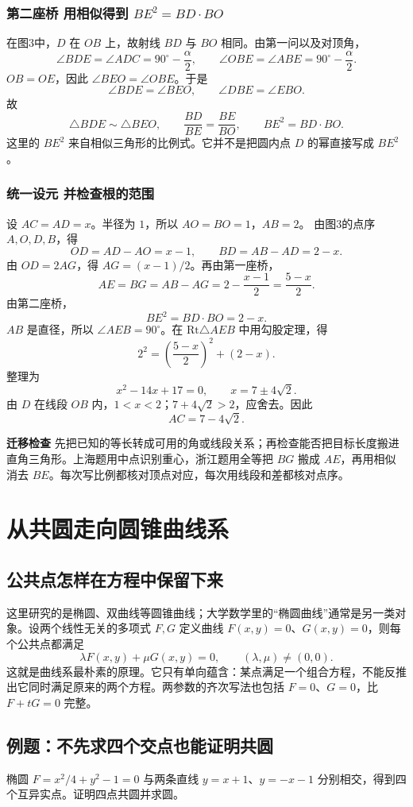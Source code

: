 \documentclass[lang=cn,12pt,fontset=none,a4paper,openany]{beautybook}
\newcommand{\level}[1]{\par\smallskip\noindent\textcolor{coverfgcolor}{\textbf{#1}}\quad}
\begin{document}
\subsection{第二座桥 用相似得到 $BE^2=BD\cdot BO$}
在图3中，$D$ 在 $OB$ 上，故射线 $BD$ 与 $BO$ 相同。由第一问以及对顶角，
\[
 \angle BDE=\angle ADC=90^\circ-\frac\alpha2,
 \qquad
 \angle OBE=\angle ABE=90^\circ-\frac\alpha2.
\]
$OB=OE$，因此 $\angle BEO=\angle OBE$。于是
\[
 \angle BDE=\angle BEO,
 \qquad \angle DBE=\angle EBO.
\]
故
\[
 \triangle BDE\sim\triangle BEO,
 \qquad \frac{BD}{BE}=\frac{BE}{BO},
 \qquad \boxed{BE^2=BD\cdot BO}.
\]
这里的 $BE^2$ 来自相似三角形的比例式。它并不是把圆内点 $D$ 的幂直接写成 $BE^2$。

\subsection{统一设元 并检查根的范围}
设 $AC=AD=x$。半径为 $1$，所以 $AO=BO=1$，$AB=2$。
由图3的点序 $A,O,D,B$，得
\[
 OD=AD-AO=x-1,\qquad BD=AB-AD=2-x.
\]
由 $OD=2AG$，得 $AG=(x-1)/2$。再由第一座桥，
\[
 AE=BG=AB-AG=2-\frac{x-1}{2}=\frac{5-x}{2}.
\]
由第二座桥，
\[
 BE^2=BD\cdot BO=2-x.
\]
$AB$ 是直径，所以 $\angle AEB=90^\circ$。在 $\mathrm{Rt}\triangle AEB$ 中用勾股定理，得
\[
 2^2=\left(\frac{5-x}{2}\right)^2+(2-x).
\]
整理为
\[
 x^2-14x+17=0,\qquad x=7\pm4\sqrt2.
\]
由 $D$ 在线段 $OB$ 内，$1<x<2$；$7+4\sqrt2>2$，应舍去。因此
\[
 \boxed{AC=7-4\sqrt2}.
\]

\level{迁移检查}
先把已知的等长转成可用的角或线段关系；再检查能否把目标长度搬进直角三角形。上海题用中点识别重心，浙江题用全等把 $BG$ 搬成 $AE$，再用相似消去 $BE$。每次写比例都核对顶点对应，每次用线段和差都核对点序。


\chapter{从共圆走向圆锥曲线系}
\section{公共点怎样在方程中保留下来}
这里研究的是椭圆、双曲线等圆锥曲线；大学数学里的“椭圆曲线”通常是另一类对象。设两个线性无关的多项式 $F,G$ 定义曲线 $F(x,y)=0$、$G(x,y)=0$，则每个公共点都满足
\[
 \lambda F(x,y)+\mu G(x,y)=0,\qquad (\lambda,\mu)\ne(0,0).
\]
这就是曲线系最朴素的原理。它只有单向蕴含：某点满足一个组合方程，不能反推出它同时满足原来的两个方程。两参数的齐次写法也包括 $F=0$、$G=0$，比 $F+tG=0$ 完整。
\section{例题：不先求四个交点也能证明共圆}
椭圆 $F=x^2/4+y^2-1=0$ 与两条直线 $y=x+1$、$y=-x-1$ 分别相交，得到四个互异实点。证明四点共圆并求圆。
\end{document}
